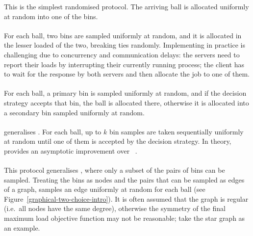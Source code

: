 This is the simplest randomised protocol. The arriving ball is allocated uniformly at random into one of the bins.

\paragraph{\TwoChoice}
For each ball, two bins are sampled uniformly at random, and it is allocated in the lesser loaded of the two, breaking ties randomly. Implementing \TwoChoice in practice is challenging due to concurrency and communication delays: the servers need to report their loads by interrupting their currently running process; the client has to wait for the response by both servers and then allocate the job to one of them.



\paragraph{\TwoThinning}

For each ball, a primary bin is sampled uniformly at random, and if the decision strategy accepts that bin, the ball is allocated there, otherwise it is allocated into a secondary bin sampled uniformly at random.


\paragraph{\KThinning}

\KThinning generalises \TwoThinning. For each ball, up to $k$ bin samples are taken sequentially uniformly at random until one of them is accepted by the decision strategy. In theory, \KThinning provides an asymptotic improvement over \TwoThinning~\cite{feldheim2020dthinning, los2021quantilethreshold}.


\paragraph{\GraphicalTwoChoice}
This protocol generalises \TwoChoice, where only a subset of the pairs of bins can be sampled. Treating the bins as nodes and the pairs that can be sampled as edges of a graph, \GraphicalTwoChoice samples an edge uniformly at random for each ball (see Figure~\ref{graphical-two-choice-intro}). It is often assumed that the graph is regular (i.e.\ all nodes have the same degree), otherwise the symmetry of the final maximum load objective function may not be reasonable; take the star graph as an example.

